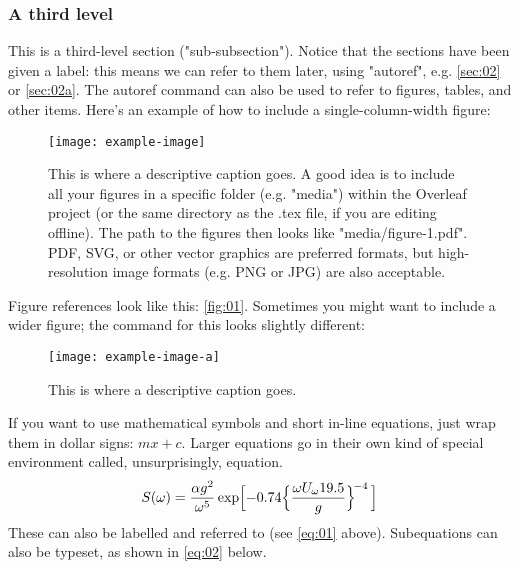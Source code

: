\documentclass[draft, {\secondLanguage}, english]{volcanica-template}
\begin{document}
\subsubsection{A third level}\label{sec:02aa}
This is a third-level section ("sub-subsection"). Notice that the sections have been given a label: this means we can refer to them later, using "autoref", e.g. \autoref{sec:02} or \autoref{sec:02a}. The autoref command can also be used to refer to figures, tables, and other items. Here's an example of how to include a single-column-width figure:

\begin{figure}[!b]								%
\centering
\texttt{[image: example-image]} %
\caption{This is where a descriptive caption goes. A good idea is to include all your figures in a specific folder (e.g. "media") within the Overleaf project (or the same directory as the .tex file, if you are editing offline). The path to the figures then looks like "media/figure-1.pdf". PDF, SVG, or other vector graphics are preferred formats, but high-resolution image formats (e.g. PNG or JPG) are also acceptable.}		%
\label{fig:01}			%
\end{figure}

Figure references look like this: \autoref{fig:01}. Sometimes you might want to include a wider figure; the command for this looks slightly different:
\begin{figure*}[!t]								%
\centering
\texttt{[image: example-image-a]} %
\caption{This is where a descriptive caption goes.}	%
\label{fig:02}									%
\end{figure*}

If you want to use mathematical symbols and short in-line equations, just wrap them in dollar signs: $mx +c$. Larger equations go in their own kind of special environment called, unsurprisingly, equation.
\begin{equation}
S(\omega) = \frac{\alpha g^2}{\omega^5} \exp\Bigl[ -0.74\Bigl\{\frac{\omega U_\omega 19.5}{g}\Bigr\}^{\!-4}\,\Bigr] 
\label{eq:01}\end{equation}
These can also be labelled and referred to (see \autoref{eq:01} above). Subequations can also be typeset, as shown in \autoref{eq:02} below.
\end{document}
